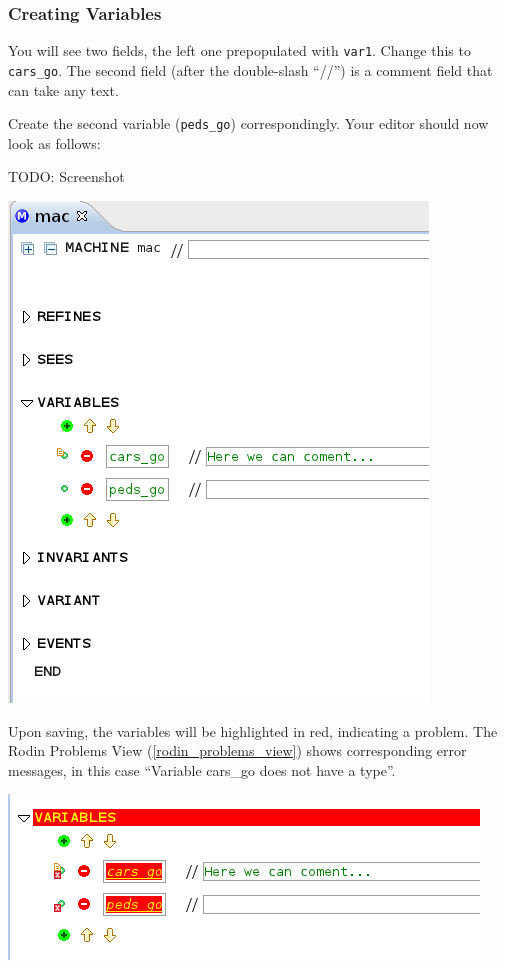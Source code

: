 \subsubsection{Creating Variables}

You will see two fields, the left one prepopulated with \texttt{var1}.  Change this to \texttt{cars\_go}.  The second field (after the double-slash ``//'') is a comment field that can take any text.


Create the second variable (\texttt{peds\_go}) correspondingly.  Your editor should now look as follows:

TODO: Screenshot
\begin{center}
	\includegraphics[]{img/tutorial/tut_3_new-variable.png}
\end{center}

Upon saving, the variables will be highlighted in red, indicating a problem.  The \textsf{Rodin Problems} View (\ref{rodin_problems_view}) shows corresponding error messages, in this case ``Variable cars\_go does not have a type''.
\begin{center}
	\includegraphics[]{img/tutorial/tut_3_error.png}
\end{center}


